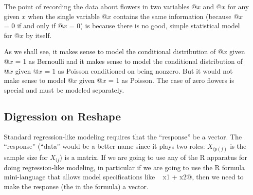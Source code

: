 \documentclass[11pt]{article}
\begin{document}
The point of recording the data about flowers in two variables
@$x$ and @$x$ for any given $x$ when the
single variable @$x$ contains the same information
(because @$x$ = 0 if and only if @$x$ = 0)
is because there is no good, simple statistical model for @$x$
by itself.

As we shall see, it makes sense to model the conditional distribution of
@$x$ given @$x$ = 1 as Bernoulli and it makes sense
to model the conditional distribution of
@$x$ given @$x$ = 1 as Poisson conditioned on being
nonzero.  But it would not make sense to model @$x$
given @$x$ = 1 as Poisson.  The case of zero flowers is special
and must be modeled separately.

\subsection{Digression on Reshape}

Standard regression-like modeling requires that the ``response'' be
a vector.  The ``response'' (``data'' would be a better name since it
plays two roles: $X_{i p(j)}$ is the sample size for $X_{i j}$) is a
matrix.  If we are going to use any of the R apparatus for doing
regression-like modeling, in particular if we are going to use the
R formula mini-language that allows model specifications like
\verb@y ~ x1 + x2@, then we need to make the response (the \verb@y@
in the formula) a vector.
\end{document}
